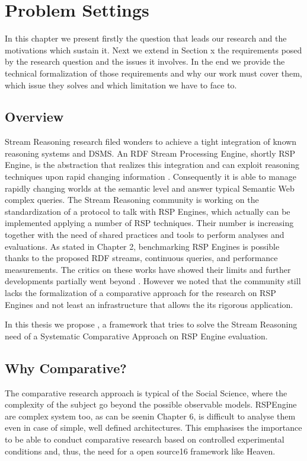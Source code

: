 \chapter{Problem Settings}

In this chapter we present firstly the question that leads our research and the motivations which sustain it. Next we extend in Section x  the requirements posed by the research question and the issues it involves. In the end we provide the technical formalization of those requirements and why our work must cover them, which issue they solves and which limitation we have to face to.

\section{Overview}
Stream Reasoning research filed wonders to achieve a tight integration of known reasoning systems and DSMS. An RDF Stream Processing Engine, shortly RSP Engine, is the abstraction that realizes this integration and can exploit reasoning techniques upon rapid changing information \cite{Background SW, DSMS, SR}. Consequently it is able to  manage rapidly changing worlds at the semantic level and answer typical Semantic Web complex queries. The Stream Reasoning community is working on the standardization of a protocol to talk with RSP Engines, which actually can be implemented applying a number of RSP techniques. Their number is increasing together with the need of shared practices and tools to perform analyses and evaluations. As stated in Chapter 2, benchmarking RSP Engines is possible thanks to the proposed RDF streams, continuous queries, and performance measurements. The critics on these works have showed their limits and further developments partially went beyond \cite{paper paper}. However we noted that the community still lacks the formalization of a comparative approach for the research on RSP Engines and not least an infrastructure that allows the its rigorous application.

In this thesis we propose \namens, a framework that tries to solve the Stream Reasoning need of a Systematic Comparative Approach on RSP Engine evaluation.

\section{Why Comparative?}

The comparative research approach is typical of the Social Science, where the complexity of the subject go beyond the possible observable models. RSPEngine are complex system too, as can be seenin Chapter 6, is difficult to analyse them even in case of simple, well defined architectures. This emphasises the importance to be able to conduct comparative research based on controlled experimental conditions and, thus, the need for a open source16 framework like Heaven.

